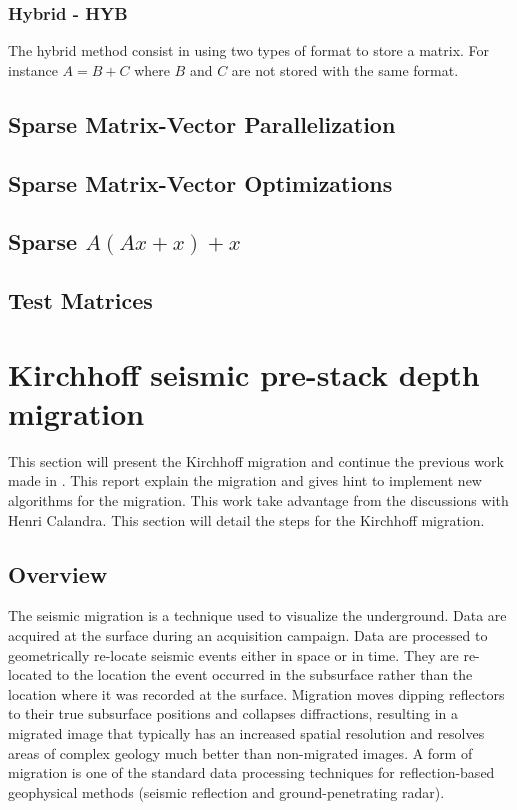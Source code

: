 \subsubsection{Hybrid - HYB}

The hybrid method consist in using two types of format to store a matrix.
For instance $A = B + C$ where $B$ and $C$ are not stored with the same format.
\subsection{Sparse Matrix-Vector Parallelization}
\subsection{Sparse Matrix-Vector Optimizations}
\subsection{Sparse $A(Ax + x) + x$}
\subsection{Test Matrices}


\section{Kirchhoff seismic pre-stack depth migration}

This section will present the Kirchhoff migration and continue the previous work made in \cite{rapport_Total_Petiton}.
This report explain the migration and gives hint to implement new algorithms for the migration.
This work take advantage from the discussions with Henri Calandra.
This section will detail the steps for the Kirchhoff migration.

\subsection{Overview}
The seismic migration is a technique used to visualize the underground.
Data are acquired at the surface during an acquisition campaign.
Data are processed to geometrically re-locate seismic events either in space or in time.
They are re-located to the location the event occurred in the subsurface rather than the location where it was recorded at the surface.
Migration moves dipping reflectors to their true subsurface positions and collapses diffractions, resulting in a migrated image that typically has an increased spatial resolution and resolves areas of complex geology much better than non-migrated images.
A form of migration is one of the standard data processing techniques for reflection-based geophysical methods (seismic reflection and ground-penetrating radar).

